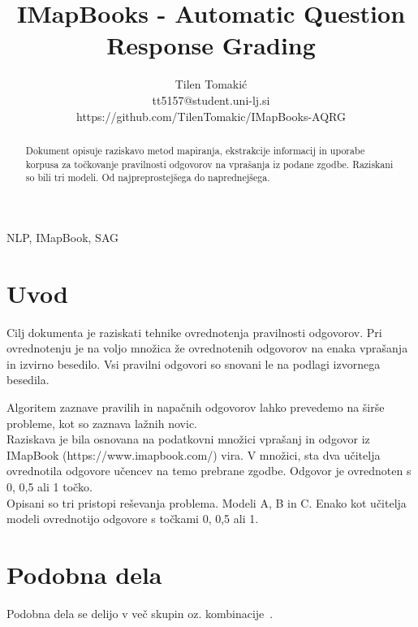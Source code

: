 \documentclass[journal]{IEEEtran}
\begin{document}
\title{IMapBooks - Automatic Question Response Grading}
\author{Tilen Tomakić\\tt5157@student.uni-lj.si\\https://github.com/TilenTomakic/IMapBooks-AQRG}%
\maketitle

\begin{abstract}	
  Dokument opisuje raziskavo metod mapiranja, ekstrakcije informacij in uporabe korpusa za točkovanje pravilnosti odgovorov na vprašanja iz podane zgodbe. Raziskani so bili tri modeli. Od najpreprostejšega do naprednejšega.
\end{abstract}

\begin{IEEEkeywords}
NLP, IMapBook, SAG
\end{IEEEkeywords}

\IEEEpeerreviewmaketitle

\section{Uvod}
Cilj dokumenta je raziskati tehnike ovrednotenja pravilnosti odgovorov. Pri ovrednotenju je na voljo množica že ovrednotenih odgovorov na enaka vprašanja in izvirno besedilo. Vsi pravilni odgovori so snovani le na podlagi izvornega besedila.

Algoritem zaznave pravilih in napačnih odgovorov lahko prevedemo na širše probleme, kot so zaznava lažnih novic.\\

Raziskava je bila osnovana na podatkovni množici vprašanj in odgovor iz IMapBook (https://www.imapbook.com/) vira. V množici, sta dva učitelja ovrednotila odgovore učencev na temo prebrane zgodbe. Odgovor je ovrednoten s 0, 0,5 ali 1 točko.\\

Opisani so tri pristopi reševanja problema. Modeli A, B in C. Enako kot učitelja modeli ovrednotijo odgovore s točkami 0, 0,5 ali 1.

\section{Podobna dela}
Podobna dela se delijo v več skupin oz. kombinacije~\cite{adhya2016automated}.
\end{document}
